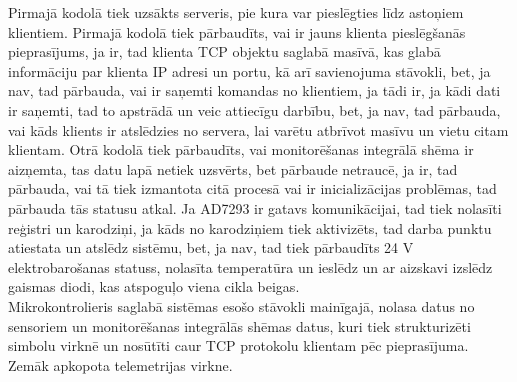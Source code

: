 Pirmajā kodolā tiek uzsākts serveris, pie kura var pieslēgties līdz astoņiem klientiem. Pirmajā kodolā tiek pārbaudīts, vai ir jauns klienta pieslēgšanās pieprasījums, ja ir, tad klienta TCP objektu saglabā masīvā, kas glabā informāciju par klienta IP adresi un portu, kā arī savienojuma stāvokli, bet, ja nav, tad pārbauda, vai ir saņemti komandas no klientiem, ja tādi ir, ja kādi dati ir saņemti, tad to apstrādā un veic attiecīgu darbību, bet, ja nav, tad pārbauda, vai kāds klients ir atslēdzies no servera, lai varētu atbrīvot masīvu un vietu citam klientam. Otrā kodolā tiek pārbaudīts, vai monitorēšanas integrālā shēma ir aizņemta, tas datu lapā netiek uzsvērts, bet pārbaude netraucē, ja ir, tad pārbauda, vai tā tiek izmantota citā procesā vai ir inicializācijas problēmas, tad pārbauda tās statusu atkal. Ja AD7293 ir gatavs komunikācijai, tad tiek nolasīti reģistri un karodziņi, ja kāds no karodziņiem tiek aktivizēts, tad darba punktu atiestata un atslēdz sistēmu, bet, ja nav, tad tiek pārbaudīts 24 V elektrobarošanas statuss, nolasīta temperatūra un ieslēdz un ar aizskavi izslēdz gaismas diodi, kas atspoguļo viena cikla beigas.\\
Mikrokontrolieris saglabā sistēmas esošo stāvokli mainīgajā, nolasa datus no sensoriem un monitorēšanas integrālās shēmas datus, kuri tiek strukturizēti simbolu virknē un nosūtīti caur TCP protokolu klientam pēc pieprasījuma. Zemāk apkopota telemetrijas virkne.
